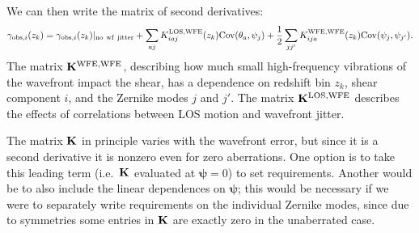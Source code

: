 \documentclass[aps,prd, amsmath,amssymb,superscriptaddress,showkeys,nofootinbib,reprint,preprintnumbers]{revtex4-1}
\begin{document}
\begin{widetext}
We can then write the matrix of second derivatives:
\begin{equation}
\gamma_{{\rm obs},i}(z_k) = \gamma_{{\rm obs},i}(z_k)|_{\rm no~wf~jitter}
+ \sum_{aj} K^{\rm LOS,WFE}_{iaj}(z_k) {\rm Cov}({\theta}_a,{\psi}_j)
+ \frac12 \sum_{jj'} K^{\rm WFE,WFE}_{ija}(z_k) {\rm Cov}({\psi}_j,{\psi}_{j'}).
\label{eq:gamma-S-Sens}
\end{equation}
The matrix ${\bf K}^{\rm WFE,WFE}$, describing how much small
high-frequency vibrations of the wavefront impact the shear, has a
dependence on redshift bin $z_k$, shear component $i$, and the Zernike
modes $j$ and $j'$. The matrix ${\bf K}^{\rm LOS,WFE}$ describes the
effects of correlations between LOS motion and wavefront jitter.

The matrix ${\bf K}$ in principle varies with the wavefront error, but
since it is a second derivative it is nonzero even for zero
aberrations. One option is to take this leading term (i.e.\ ${\bf K}$
evaluated at ${\boldsymbol\psi}=0$) to set requirements. Another would
be to also include the linear dependences on ${\boldsymbol\psi}$; this
would be necessary if we were to separately write requirements on the
individual Zernike modes, since due to symmetries some entries in
${\bf K}$ are exactly zero in the unaberrated case.


\end{widetext}
\end{document}
